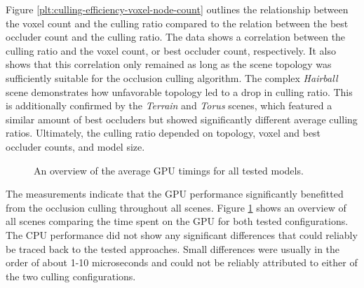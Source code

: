 \noindent
Figure \ref{plt:culling-efficiency-voxel-node-count} outlines the relationship between the voxel 
count and the culling ratio compared to the relation between the best occluder count and the culling 
ratio. The data shows a correlation between the culling ratio and the voxel count, or best occluder 
count, respectively. It also shows that this correlation only remained as long as the scene topology 
was sufficiently suitable for the occlusion culling algorithm. The complex \emph{Hairball} scene 
demonstrates how unfavorable topology led to a drop in culling ratio. This is additionally confirmed 
by the \emph{Terrain} and \emph{Torus} scenes, which featured a similar amount of best occluders 
but showed significantly different average culling ratios. Ultimately, the culling ratio depended 
on topology, voxel and best occluder counts, and model size. \\


\begin{figure}[!htb]    %
  \begin{center}
  \end{center}
  \caption{An overview of the average \ac{GPU} timings for all tested models.}
  \label{fig:gpu-performance-overview}
\end{figure}

\noindent
The measurements indicate that the \ac{GPU} performance significantly benefitted from the occlusion 
culling throughout all scenes. Figure \ref{fig:gpu-performance-overview} shows an overview of all 
scenes comparing the time spent on the \ac{GPU} for both tested configurations. The \ac{CPU} 
performance did not show any significant differences that could reliably be traced back to the 
tested approaches. Small differences were usually in the order of about 1-10 microseconds and could 
not be reliably attributed to either of the two culling configurations. \\

